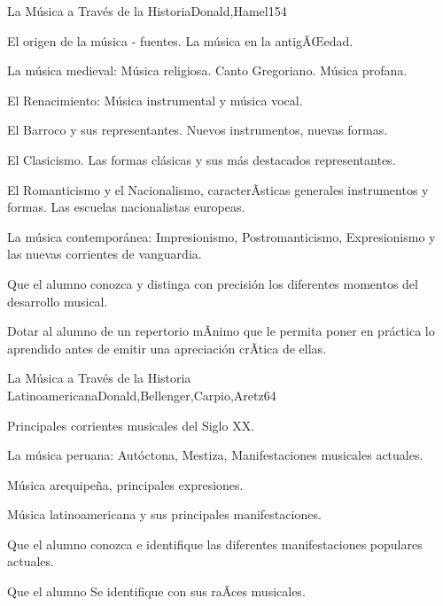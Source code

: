 \begin{syllabus}
\begin{unit}{La Música a Través de la Historia}{Donald,Hamel}{15}{4}
\begin{topics}
	\item El origen de la música - fuentes. La música en la antigÃŒedad.
	\item La música medieval: Música religiosa.  Canto Gregoriano. Música profana.
	\item El Renacimiento: Música instrumental y música vocal.
	\item El Barroco y sus representantes. Nuevos instrumentos, nuevas formas.
	\item El Clasicismo. Las formas clásicas y sus más destacados representantes.
	\item El Romanticismo y el Nacionalismo, caracterÃ­sticas generales instrumentos y formas. Las escuelas nacionalistas europeas.
	\item La música contemporánea: Impresionismo, Postromanticismo, Expresionismo y las nuevas corrientes de vanguardia.
\end{topics}
\begin{unitgoals}
	\item Que el alumno conozca y distinga con precisión los diferentes momentos del desarrollo musical.
	\item Dotar al alumno de un repertorio mÃ­nimo que le permita poner en práctica lo aprendido antes de emitir una apreciación crÃ­tica de ellas.
\end{unitgoals}
\end{unit}

\begin{unit}{La Música a Través de la Historia Latinoamericana}{Donald,Bellenger,Carpio,Aretz}{6}{4}
\begin{topics}
	\item Principales corrientes musicales del Siglo XX.
	\item La música peruana: Autóctona, Mestiza, Manifestaciones musicales actuales.
	\item Música arequipeña, principales expresiones.
	\item Música latinoamericana y sus principales manifestaciones.
\end{topics}
\begin{unitgoals}
	\item Que el alumno conozca e identifique las diferentes manifestaciones populares actuales. 
	\item Que el alumno Se identifique con sus raÃ­ces musicales.
\end{unitgoals}
\end{unit}



\begin{coursebibliography}
\end{coursebibliography}

\end{syllabus}
